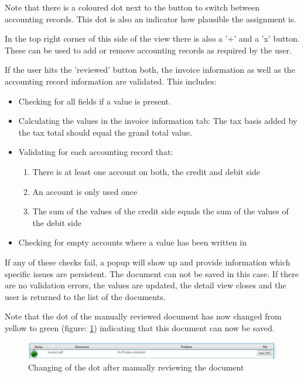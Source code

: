 Note that there is a coloured dot next to the button to switch between accounting records. This dot is also an indicator how plausible the assignment is. 

In the top right corner of this side of the view there is also a '+' and a 'x' button. These can be used to add or remove accounting records as required by the user.

If the user hits the 'reviewed' button both, the invoice information as well as the accounting record information are validated. This includes:
\begin{itemize}
	\item Checking for all fields if a value is present.
	\item Calculating the values in the invoice information tab: The tax basis added by the tax total should equal the grand total value.
	\item Validating for each accounting record that:
		\begin{enumerate}
			\item There is at least one account on both, the credit and debit side
			\item An account is only used once
			\item The sum of the values of the credit side equals the sum of the values of the debit side
		\end{enumerate}
	\item Checking for empty accounts where a value has been written in
\end{itemize}

If any of these checks fail, a popup will show up and provide information which specific issues are persistent. The document can not be saved in this case. If there are no validation errors, the values are updated, the detail view closes and the user is returned to the list of the documents.

Note that the dot of the manually reviewed document has now changed from yellow to green (figure: \ref{greenAfterReview}) indicating that this document can now be saved.

\begin{figure}[ht!]
\centering
\includegraphics[width=\textwidth]{Images/GUI/GreenAfterReview.jpg}
\caption{Changing of the dot after manually reviewing the document \label{greenAfterReview}}
\end{figure}

